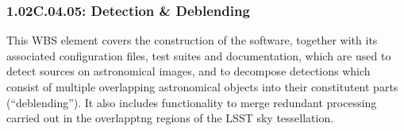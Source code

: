 \subsubsection{1.02C.04.05: Detection \& Deblending}

This WBS element covers the construction of the software, together with its
associated configuration files, test suites and documentation, which are used
to detect sources on astronomical images, and to decompose detections which
consist of multiple overlapping astronomical objects into their constitutent
parts (``deblending''). It also includes functionality to merge redundant
processing carried out in the overlapptng regions of the LSST sky
tessellation.
